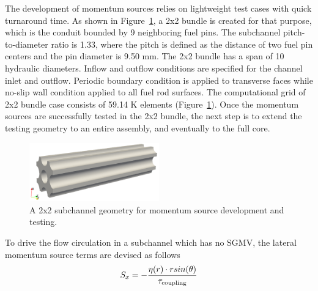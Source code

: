 The development of momentum sources relies on lightweight test cases with quick turnaround time. As shown in Figure~\ref{fig:model2x2}, a 2x2 bundle is created for that purpose, which is the conduit bounded by 9 neighboring fuel pins. The subchannel pitch-to-diameter ratio is 1.33, where the pitch is defined as the distance of two fuel pin centers and the pin diameter is 9.50 mm. The 2x2 bundle has a span of 10 hydraulic diameters. Inflow and outflow conditions are specified for the channel inlet and outflow. Periodic boundary condition is applied to transverse faces while no-slip wall condition applied to all fuel rod surfaces. The computational grid of 2x2 bundle case consists of 59.14 K elements (Figure~\ref{fig:model2x2}). Once the momentum sources are successfully tested in the 2x2 bundle, the next step is to extend the testing geometry to an entire assembly, and eventually to the full core.

\begin{figure}[!ht]
\centering
\includegraphics[width=0.5\textwidth]{./figures/3DModel_of_bundle2x2.png}
\caption{A 2x2 subchannel geometry for momentum source development and testing. }
\label{fig:model2x2}
\end{figure}

To drive the flow circulation in a subchannel which has no SGMV, the lateral momentum source terms are devised as follows
\begin{equation}
  S_x = -\frac{\eta(r)\cdot r sin(\theta)}{\tau_\text{coupling}}\\
\end{equation}

